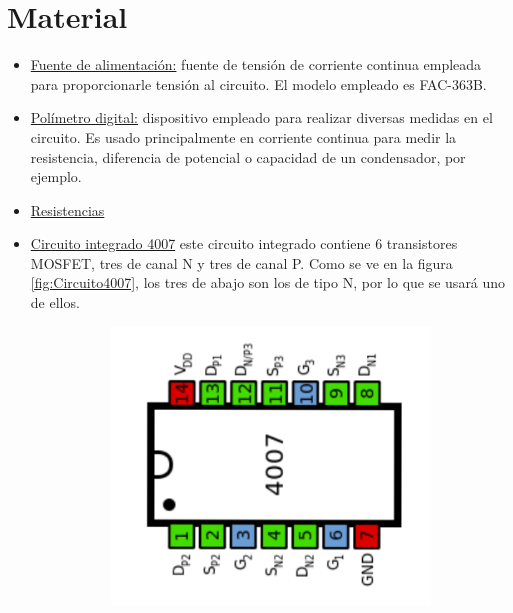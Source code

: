 \section{Material}
\begin{itemize}
    \item \underline{Fuente de alimentación:} fuente de tensión de corriente continua empleada para proporcionarle tensión al circuito. El modelo empleado es FAC-363B.
    \item \underline{Polímetro digital:} dispositivo empleado para realizar diversas medidas en el circuito. Es usado principalmente en corriente continua para medir la resistencia, diferencia de potencial o capacidad de un condensador, por ejemplo.
    \item \underline{Resistencias}
    \item \underline{Circuito integrado 4007} este circuito integrado contiene 6 transistores MOSFET, tres de canal N y tres de canal P. Como se ve en la figura \ref{fig:Circuito4007}, los tres de abajo son los de tipo N, por lo que se usará uno de ellos.
    \begin{figure}
        \centering
        \begin{subfigure}[b]{0.3\textwidth}
             \centering
             \includegraphics[width=\textwidth]{Imágenes 05/Pinout_4007.png}
         \end{subfigure}
         \hfill
         \begin{subfigure}[b]{0.3\textwidth}

\end{subfigure}
\end{figure}
\end{itemize}

